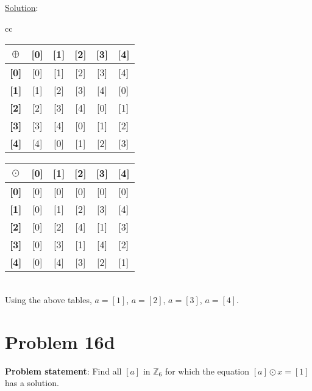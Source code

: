 \documentclass{article} %
\begin{document}
\underline{Solution}: 
\begin{addmargin}[1em]{0em}
\begin{tabular}{cc}
\begin{tabular}{|c|c|c|c|c|c|}
\hline
\textbf{$\oplus$}&\textbf{[0]}&\textbf{[1]}&\textbf{[2]}&\textbf{[3]}&\textbf{[4]}\\ \hline
\textbf{[0]} & [0] & [1] & [2] & [3] & [4] \\ \hline
\textbf{[1]} & [1] & [2] & [3] & [4] & [0]\\ \hline
\textbf{[2]} & [2] & [3] & [4] & [0] & [1]\\ \hline
\textbf{[3]} & [3] & [4] & [0] & [1] & [2]\\ \hline
\textbf{[4]} & [4] & [0] & [1] & [2] & [3]\\ \hline
\end{tabular}

\quad

\begin{tabular}{|c|c|c|c|c|c|}
\hline
\textbf{$\odot$}&\textbf{[0]}&\textbf{[1]}&\textbf{[2]}&\textbf{[3]}&\textbf{[4]}\\ \hline
\textbf{[0]} & [0] & [0] & [0] & [0] & [0] \\ \hline
\textbf{[1]} & [0] & [1] & [2] & [3] & [4]\\ \hline
\textbf{[2]} & [0] & [2] & [4] & [1] & [3]\\ \hline
\textbf{[3]} & [0] & [3] & [1] & [4] & [2]\\ \hline
\textbf{[4]} & [0] & [4] & [3] & [2] & [1]\\ \hline
\end{tabular}
\end{tabular}
\\ \break Using the above tables, $a = [1]$, $a = [2]$, $a = [3]$, $a = [4]$.
\end{addmargin}

\newpage

\section*{Problem 16d}


\textbf{Problem statement}: Find all $[a]$ in $\mathbb{Z}_6$ for which the equation $[a] \odot x = [1]$ has a solution.
\\
\end{document}
